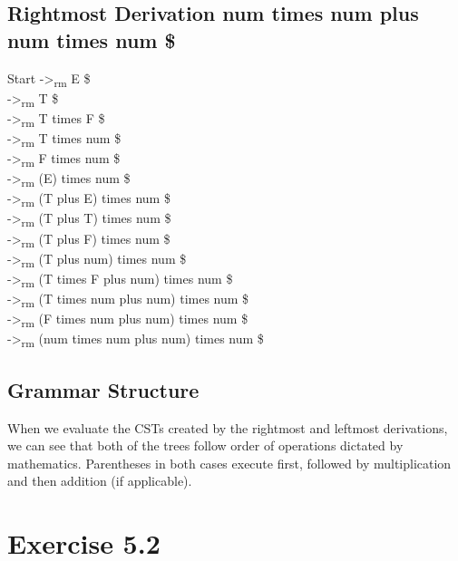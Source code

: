 \documentclass[letterpaper, 10pt,DIV=13]{scrartcl}
\numberwithin{equation}{section} %
\numberwithin{figure}{section} %
\numberwithin{table}{section} %
\begin{document}
\subsection{Rightmost Derivation num times num plus num times num \$}

Start ->\textsubscript{rm} E \$ \\
->\textsubscript{rm} T \$ \\
->\textsubscript{rm} T times F \$ \\
->\textsubscript{rm} T times num \$ \\
->\textsubscript{rm} F times num \$ \\
->\textsubscript{rm} (E) times num \$ \\
->\textsubscript{rm} (T plus E) times num \$ \\
->\textsubscript{rm} (T plus T) times num \$ \\
->\textsubscript{rm} (T plus F) times num \$ \\
->\textsubscript{rm} (T plus num) times num \$ \\
->\textsubscript{rm} (T times F plus num) times num \$ \\
->\textsubscript{rm} (T times num plus num) times num \$ \\
->\textsubscript{rm} (F times num plus num) times num \$ \\
->\textsubscript{rm} (num times num plus num) times num \$

\subsection{Grammar Structure}
When we evaluate the CSTs created by the rightmost and leftmost derivations, we can see that both of the trees follow order of operations dictated by mathematics. Parentheses in both cases execute first, followed by multiplication and then addition (if applicable).


\pagebreak

\section{Exercise 5.2}
\end{document}
